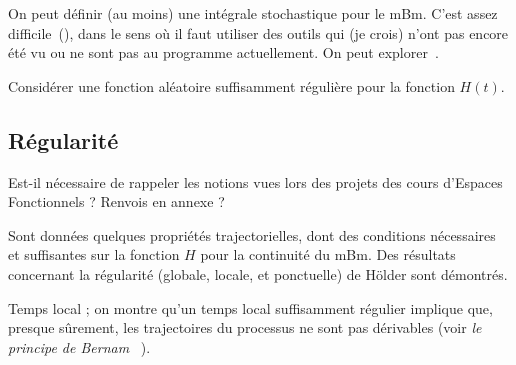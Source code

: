 \begin{piste}
  On peut définir (au moins) une intégrale stochastique pour le
  mBm. C'est assez difficile~(\cite{lebovits2014}), dans le sens où il
  faut utiliser des outils qui (je crois) n'ont pas encore été vu ou
  ne sont pas au programme actuellement. On peut
  explorer~\cite{herbin2012}.
\end{piste}

\begin{piste}
  Considérer une fonction aléatoire suffisamment régulière pour la
  fonction $H(t)$.
\end{piste}

\subsection{Régularité}

\begin{question}
  Est-il nécessaire de rappeler les notions vues lors des projets des
  cours d'Espaces Fonctionnels ? Renvois en annexe ?
\end{question}

Sont données quelques propriétés trajectorielles, dont des conditions
nécessaires et suffisantes sur la fonction $H$ pour la continuité du
mBm. Des résultats concernant la régularité (globale, locale, et
ponctuelle) de Hölder sont démontrés.

\begin{prerequis}
  Temps local ; on montre qu'un temps local suffisamment régulier
  implique que, presque sûrement, les trajectoires du processus ne
  sont pas dérivables (voir \emph{\og le principe de Bernam
    \fg{}}~\cite[Sec.~2.3]{ayache2018}).
\end{prerequis}